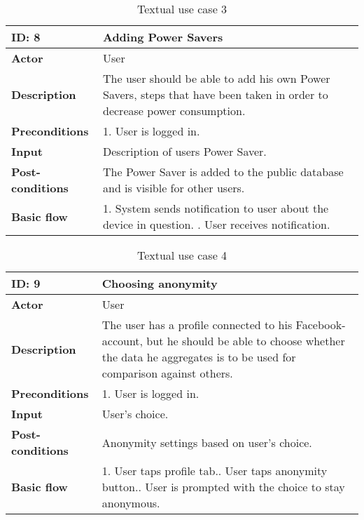 \begin{table}[H]
\begin{tabular}{|l|p{11.7cm}|}
\hline
\textbf{ID: }8&\textbf{Adding Power Savers}
\\\hline
\textbf{Actor} &User
\\\hline
\textbf{Description}&
The user should be able to add his own Power Savers, steps that have been taken in order to decrease power consumption.\\\hline
\textbf{Preconditions}&
1. User is logged in.\\\hline
\textbf{Input}&
Description of users Power Saver.
\\\hline
\textbf{Post-conditions}& 
The Power Saver is added to the public database and is visible for other users.
\\\hline
\textbf{Basic flow}&
1. System sends notification to user about the device in question. \newline
2. User receives notification.
\\\hline
\end{tabular}
\caption{Textual use case 3}
\end{table}


\begin{table}[H]
\begin{tabular}{|l|p{11.7cm}|}
\hline
\textbf{ID: }9&\textbf{Choosing anonymity}
\\\hline
\textbf{Actor} &User
\\\hline
\textbf{Description}&
The user has a profile connected to his Facebook-account, but he should be able to choose whether the data he aggregates is to be used for comparison against others.\\\hline
\textbf{Preconditions}&
1. User is logged in.\\\hline
\textbf{Input}&
User's choice.
\\\hline
\textbf{Post-conditions}& 
Anonymity settings based on user's choice.
\\\hline
\textbf{Basic flow}&
1. User taps profile tab.\newline
2. User taps anonymity button.\newline
3. User is prompted with the choice to stay anonymous.
\\\hline
\end{tabular}
\caption{Textual use case 4}
\end{table}

